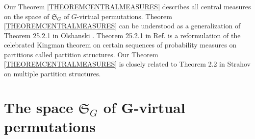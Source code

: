 \documentclass[12pt]{amsart}
\theoremstyle{definition}
\numberwithin{equation}{section}
\begin{document}
 \subsubsection{}Our Theorem \ref{THEOREMCENTRALMEASURES} describes all central measures on the space of $\mathfrak{S}_{G}$ of $G$-virtual permutations. Theorem \ref{THEOREMCENTRALMEASURES} can be understood as a generalization of Theorem 25.2.1 in Olshanski \cite{OlshanskiRandomPermutations}.
Theorem 25.2.1 in Ref. \cite{OlshanskiRandomPermutations} is a reformulation of the celebrated Kingman theorem \cite{Kingman2} on certain sequences of probability measures on partitions called partition structures. Our Theorem \ref{THEOREMCENTRALMEASURES} is closely related to Theorem 2.2 in Strahov \cite{StrahovMPS} on multiple partition structures.
\section{The space $\mathfrak{S}_{G}$ of G-virtual permutations}
\end{document}
